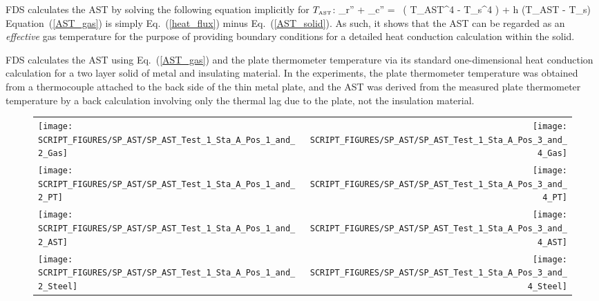 FDS calculates the AST by solving the following equation implicitly for $T_{\hbox{\tiny AST}}$:
\be {}_r'' + _c'' = \epsilon \, \left( \sigma T_{\hbox{\tiny AST}}^4 - \sigma T_s^4 \right) + h (T_{\hbox{\tiny AST}} - T_s)  \label{AST_gas} \ee
Equation~(\ref{AST_gas}) is simply Eq.~(\ref{heat_flux}) minus Eq.~(\ref{AST_solid}). As such, it shows that the AST can be regarded as an {\em effective} gas temperature for
the purpose of providing boundary conditions for a detailed heat conduction calculation within the solid.

FDS calculates the AST using Eq.~(\ref{AST_gas}) and the plate thermometer temperature via its standard one-dimensional heat conduction calculation for a
two layer solid of metal and insulating material. In the experiments, the plate thermometer temperature was obtained from a thermocouple attached to the back side of
the thin metal plate, and the AST was derived from the measured plate thermometer temperature by a back calculation involving only the thermal lag due to the
plate, not the insulation material.

\newpage


\begin{figure}[p]
\begin{tabular*}{\textwidth}{l@{\extracolsep{\fill}}r}
\texttt{[image: SCRIPT\_FIGURES/SP\_AST/SP\_AST\_Test\_1\_Sta\_A\_Pos\_1\_and\_2\_Gas]} &
\texttt{[image: SCRIPT\_FIGURES/SP\_AST/SP\_AST\_Test\_1\_Sta\_A\_Pos\_3\_and\_4\_Gas]} \\
\texttt{[image: SCRIPT\_FIGURES/SP\_AST/SP\_AST\_Test\_1\_Sta\_A\_Pos\_1\_and\_2\_PT]} &
\texttt{[image: SCRIPT\_FIGURES/SP\_AST/SP\_AST\_Test\_1\_Sta\_A\_Pos\_3\_and\_4\_PT]} \\
\texttt{[image: SCRIPT\_FIGURES/SP\_AST/SP\_AST\_Test\_1\_Sta\_A\_Pos\_1\_and\_2\_AST]} &
\texttt{[image: SCRIPT\_FIGURES/SP\_AST/SP\_AST\_Test\_1\_Sta\_A\_Pos\_3\_and\_4\_AST]} \\
\texttt{[image: SCRIPT\_FIGURES/SP\_AST/SP\_AST\_Test\_1\_Sta\_A\_Pos\_1\_and\_2\_Steel]} &
\texttt{[image: SCRIPT\_FIGURES/SP\_AST/SP\_AST\_Test\_1\_Sta\_A\_Pos\_3\_and\_4\_Steel]}
\end{tabular*}
\label{SP_Test_1_Station_A}
\end{figure}

